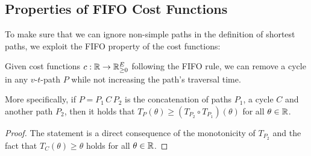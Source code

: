 \subsection{Properties of FIFO Cost Functions}

To make sure that we can ignore non-simple paths in the definition of shortest paths, we exploit the FIFO property of the cost functions:

\begin{proposition}\label{prop:removing-cycles-in-fifo-graphs}
    Given cost functions $c:\mathbb{R}\rightarrow\mathbb{R}_{\geq0}^E$ following the FIFO rule, we can remove a cycle in any $v$-$t$-path $P$ while not increasing the path's traversal time.

    More specifically, if $P=P_1\, C \, P_2$ is the concatenation of paths $P_1$, a cycle $C$ and another path $P_2$, then it holds that $
        T_P(\theta) \geq \left(
        T_{P_2} \circ T_{P_1} \right)(\theta)$ for all $\theta\in\mathbb{R}$.
\end{proposition}
\begin{proof}
The statement is a direct consequence of the monotonicity of $T_{P_2}$ and the fact that $T_C(\theta) \geq \theta$ holds for all $\theta\in\mathbb{R}$.
\end{proof}

